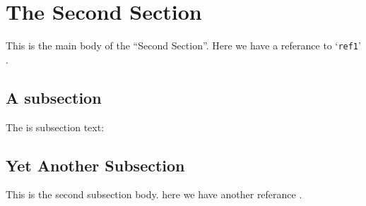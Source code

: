 \documentclass[../article.tex]{subfiles}
\begin{document}
\validinsub{%
%
\tableofcontents%
\listoffigures%
\listoftables%
\clearpage%
}

\section{The Second Section}

This is the main body of the ``Second Section''. Here we have a referance
to `\verb|ref1|' \cite{ref2}.

\subsection{A subsection}

The is subsection text: \blindtext

\subsection{Yet Another Subsection}

This is the second subsection body. here we have another referance \cite{ref4}.

\validinsub{}
\end{document}
